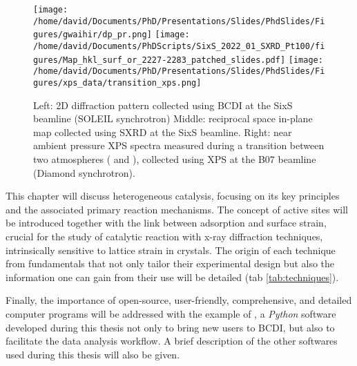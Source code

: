 \begin{figure}[!htb]
    \centering
    \texttt{[image: /home/david/Documents/PhD/Presentations/Slides/PhdSlides/Figures/gwaihir/dp\_pr.png]}
    \texttt{[image: /home/david/Documents/PhDScripts/SixS\_2022\_01\_SXRD\_Pt100/figures/Map\_hkl\_surf\_or\_2227-2283\_patched\_slides.pdf]}
    \texttt{[image: /home/david/Documents/PhD/Presentations/Slides/PhdSlides/Figures/xps\_data/transition\_xps.png]}
    \caption{
    Left: 2D diffraction pattern collected using BCDI at the SixS beamline (SOLEIL synchrotron)
    Middle: reciprocal space in-plane map collected using SXRD at the SixS beamline.
    Right: near ambient pressure XPS spectra measured during a transition between two atmospheres (  and ), collected using XPS at the B07 beamline (Diamond synchrotron).
    }
    \label{fig:TechniquesDataExamples}
\end{figure}

This chapter will discuss heterogeneous catalysis, focusing on its key principles and the associated primary reaction mechanisms.
The concept of active sites will be introduced together with the link between adsorption and surface strain, crucial for the study of catalytic reaction with x-ray diffraction techniques, intrinsically sensitive to lattice strain in crystals.
The origin of each technique from fundamentals that not only tailor their experimental design but also the information one can gain from their use will be detailed (tab \ref{tab:techniques}).

Finally, the importance of open-source, user-friendly, comprehensive, and detailed computer programs will be addressed with the example of , a \textit{Python} software developed during this thesis not only to bring new users to BCDI, but also to facilitate the data analysis workflow.
A brief description of the other softwares used during this thesis will also be given.